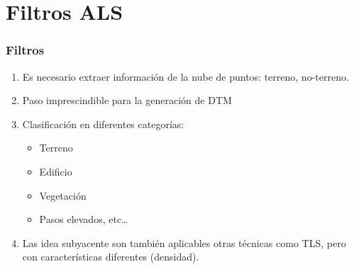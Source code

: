 \section[Filtros]{Filtros ALS}
\begin{frame}
  \frametitle{Filtros}
  \begin{enumerate}
    \item Es necesario extraer información de la nube de puntos: terreno,
      no-terreno.
    \item Paso imprescindible para la generación de DTM
    \item Clasificación en diferentes categorías:
      \begin{itemize}
        \item Terreno
        \item Edificio
        \item Vegetación
        \item Pasos elevados, etc\ldots
      \end{itemize}
    \item Las idea subyacente son también aplicables otras técnicas como TLS,
      pero con características diferentes (densidad).
  \end{enumerate}
\end{frame}
\begin{frame}
 \titlepage
\end{frame}
